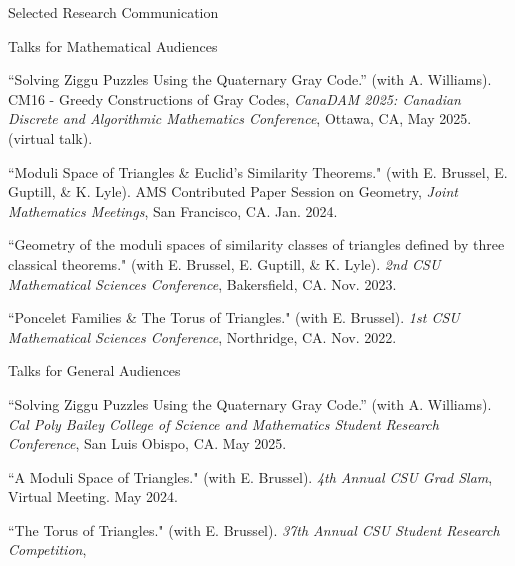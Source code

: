 \documentclass[
	11pt, %
]{cv} %
\begin{document}
\begin{rSection}{Selected Research Communication}

	\begin{rSubsectionNumbered}{Talks for Mathematical Audiences}
		\item ``Solving Ziggu Puzzles Using the Quaternary Gray Code.'' (with A. Williams). CM16 - Greedy Constructions of Gray Codes, \textit{CanaDAM 2025: Canadian Discrete and Algorithmic Mathematics Conference}, Ottawa, CA, May 2025. (virtual talk).
		\item ``Moduli Space of Triangles \& Euclid's Similarity Theorems." (with E. Brussel, E. Guptill, \& K. Lyle). AMS Contributed Paper Session on Geometry, \textit{ Joint Mathematics Meetings},
		San Francisco, CA. Jan. 2024.
		\item ``Geometry of the moduli spaces of similarity classes of triangles defined by three classical theorems." (with E. Brussel, E. Guptill, \& K. Lyle). \textit{ 2nd CSU Mathematical Sciences Conference},
		Bakersfield, CA. Nov. 2023.
		\item ``Poncelet Families \& The Torus of Triangles." (with E. Brussel). \textit{1st CSU Mathematical Sciences Conference},
		Northridge, CA. Nov. 2022.
	\end{rSubsectionNumbered}
	\begin{rSubsectionNumbered}{Talks for General Audiences}
		\item ``Solving Ziggu Puzzles Using the Quaternary Gray Code.'' (with A. Williams). \textit{Cal Poly Bailey College of Science and Mathematics Student Research Conference}, San Luis Obispo, CA. May 2025.
		\item ``A Moduli Space of Triangles." (with E. Brussel). \textit{4th Annual CSU Grad Slam},
		Virtual Meeting. May 2024.
		\item ``The Torus of Triangles." (with E. Brussel). \textit{ 37th Annual CSU Student Research Competition},

\end{rSubsectionNumbered}
\end{rSection}
\end{document}
